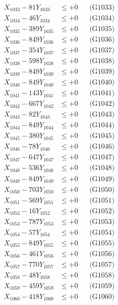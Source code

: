 \documentclass[a4paper,10pt]{article}
\begin{document}
{\begin{align}
X_{1033} - 81Y_{1033} &\leq +0 && \text{(G1033)} \\
X_{1034} - 46Y_{1034} &\leq +0 && \text{(G1034)} \\
X_{1035} - 389Y_{1035} &\leq +0 && \text{(G1035)} \\
X_{1036} - 849Y_{1036} &\leq +0 && \text{(G1036)} \\
X_{1037} - 354Y_{1037} &\leq +0 && \text{(G1037)} \\
X_{1038} - 598Y_{1038} &\leq +0 && \text{(G1038)} \\
X_{1039} - 849Y_{1039} &\leq +0 && \text{(G1039)} \\
X_{1040} - 849Y_{1040} &\leq +0 && \text{(G1040)} \\
\allowbreak
X_{1041} - 143Y_{1041} &\leq +0 && \text{(G1041)} \\
X_{1042} - 667Y_{1042} &\leq +0 && \text{(G1042)} \\
X_{1043} - 82Y_{1043} &\leq +0 && \text{(G1043)} \\
X_{1044} - 849Y_{1044} &\leq +0 && \text{(G1044)} \\
X_{1045} - 380Y_{1045} &\leq +0 && \text{(G1045)} \\
X_{1046} - 78Y_{1046} &\leq +0 && \text{(G1046)} \\
X_{1047} - 647Y_{1047} &\leq +0 && \text{(G1047)} \\
X_{1048} - 536Y_{1048} &\leq +0 && \text{(G1048)} \\
X_{1049} - 849Y_{1049} &\leq +0 && \text{(G1049)} \\
X_{1050} - 703Y_{1050} &\leq +0 && \text{(G1050)} \\
\allowbreak
X_{1051} - 569Y_{1051} &\leq +0 && \text{(G1051)} \\
X_{1052} - 16Y_{1052} &\leq +0 && \text{(G1052)} \\
X_{1053} - 787Y_{1053} &\leq +0 && \text{(G1053)} \\
X_{1054} - 57Y_{1054} &\leq +0 && \text{(G1054)} \\
X_{1055} - 849Y_{1055} &\leq +0 && \text{(G1055)} \\
X_{1056} - 461Y_{1056} &\leq +0 && \text{(G1056)} \\
X_{1057} - 770Y_{1057} &\leq +0 && \text{(G1057)} \\
X_{1058} - 48Y_{1058} &\leq +0 && \text{(G1058)} \\
X_{1059} - 459Y_{1059} &\leq +0 && \text{(G1059)} \\
X_{1060} - 418Y_{1060} &\leq +0 && \text{(G1060)} \\

\end{align}}
\end{document}
